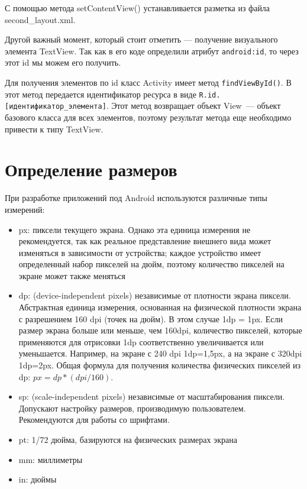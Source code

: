 С помощью метода setContentView() устанавливается разметка из файла
second\_layout.xml.\par
Другой важный момент, который стоит отметить --- получение визуального
элемента TextView. Так как в его коде определили атрибут \texttt{android:id},
то через этот id мы можем его получить.\par
Для получения элементов по id класс Activity имеет метод
\texttt{findViewById()}. В этот метод передается идентификатор ресурса в виде
\texttt{R.id.[идентификатор\_элемента]}. Этот метод возвращает объект View~---
объект базового класса для всех элементов, поэтому результат метода еще
необходимо привести к типу TextView.

\section{Определение размеров}
При разработке приложений под Android используются различные
типы измерений:
\begin{itemize}
	\item px: пиксели текущего экрана. Однако эта единица измерения не
		рекомендуется, так как реальное представление внешнего вида
		может изменяться в зависимости от устройства; каждое устройство
		имеет определенный набор пикселей на дюйм, поэтому количество
		пикселей на экране может также меняться
	\item dp: (device-independent pixels) независимые от плотности экрана
		пиксели. Абстрактная единица измерения, основанная на физической
		плотности экрана с разрешением 160 dpi (точек на дюйм).
		В этом случае 1dp = 1px. Если размер экрана больше или меньше,
		чем 160dpi, количество пикселей, которые применяются
		для отрисовки 1dp соответственно увеличивается или уменьшается.
		Например, на экране с 240 dpi 1dp=1,5px, а на экране с 320dpi 1dp=2px.
		Общая формула для получения количества физических пикселей
		из dp: \( px = dp * (dpi / 160) \).
	\item sp: (scale-independent pixels) независимые от масштабирования
		пиксели. Допускают настройку размеров, производимую
		пользователем. Рекомендуются для работы со шрифтами.
	\item pt: 1/72 дюйма, базируются на физических размерах экрана
	\item mm: миллиметры
	\item in: дюймы
\end{itemize}

